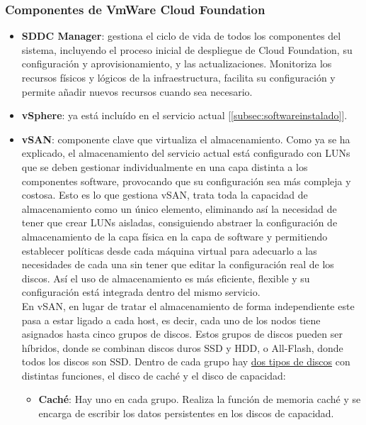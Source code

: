 \subsubsection{Componentes de VmWare Cloud Foundation \cite{componentesCloudFound}}
\label{subsubsect:cfcomponents}
\begin{itemize}
    \item \textbf{SDDC Manager}: gestiona el ciclo de vida de todos los componentes del sistema, incluyendo el proceso inicial de despliegue de Cloud Foundation, su configuración y aprovisionamiento, y las actualizaciones. Monitoriza los recursos físicos y lógicos de la infraestructura, facilita su configuración y permite añadir nuevos recursos cuando sea necesario. 
    \item \textbf{vSphere}: ya está incluído en el servicio actual [\ref{subsec:softwareinstalado}].
    \item \textbf{vSAN}: componente clave que virtualiza el almacenamiento. Como ya se ha explicado, el almacenamiento del servicio actual está configurado con LUNs que se deben gestionar individualmente en una capa distinta a los componentes software, provocando que su configuración sea más compleja y costosa. Esto es lo que gestiona vSAN, trata toda la capacidad de almacenamiento como un único elemento, eliminando así la necesidad de tener que crear LUNs aisladas, consiguiendo abstraer la configuración de almacenamiento de la capa física en la capa de software y permitiendo establecer políticas desde cada máquina virtual para adecuarlo a las necesidades de cada una sin tener que editar la configuración real de los discos. Así el uso de almacenamiento es más eficiente, flexible y su configuración está integrada dentro del mismo servicio. \\
    En vSAN, en lugar de tratar el almacenamiento de forma independiente este pasa a estar ligado a cada host, es decir, cada uno de los nodos tiene asignados hasta cinco grupos de discos. Estos grupos de discos pueden ser híbridos, donde se combinan discos duros SSD y HDD, o All-Flash, donde todos los discos son SSD. Dentro de cada grupo hay \underline{dos tipos de discos} con distintas funciones, el disco de caché y el disco de capacidad\cite{operacionesVSAN}:
        \begin{itemize}
            \item \textbf{Caché}: Hay uno en cada grupo. Realiza la función de memoria caché y se encarga de escribir los datos persistentes en los discos de capacidad.

\end{itemize}
\end{itemize}
